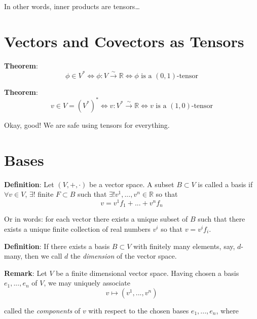 \documentclass[
  letterpaper,
  DIV=11,
  numbers=noendperiod,
  oneside]{scrreprt}
\begin{document}
In other words, inner products are tensors\ldots{}

\hypertarget{vectors-and-covectors-as-tensors}{%
\section{Vectors and Covectors as
Tensors}\label{vectors-and-covectors-as-tensors}}

\textbf{Theorem}: \begin{equation}
    \phi \in V^* \iff \phi: V\xrightarrow{\sim}\mathbb{R} \iff \phi \text{ is a } (0,1)\text{-tensor}
\end{equation}

\textbf{Theorem}: \begin{equation}
    v\in V=(V^*)^* \iff v:V^* \xrightarrow{\sim} \mathbb{R} \iff v \text{ is a } (1,0)\text{-tensor}
\end{equation}

Okay, good! We are safe using tensors for everything.

\hypertarget{bases}{%
\section{Bases}\label{bases}}

\textbf{Definition}: Let \((V, +, \cdot)\) be a vector space. A subset
\(B \subset V\) is called a basis if
\(\forall v\in V\), \(\exists !\) finite \(F\subset B\) such that
\(\exists ! v^1,...,v^n \in \mathbb{R}\) so that \begin{equation}
 v = v^1f_1 + ... + v^n f_n
\end{equation}

Or in words: for each vector there exists a unique subset of \(B\) such
that there exists a unique finite collection of real numbers \(v^i\) so
that \(v=v^if_i\).

\textbf{Definition}: If there exists a basis \(B\subset V\) with
finitely many elements, say, \(d\)-many, then we call \(d\) the
\emph{dimension} of the vector space.

\textbf{Remark}: Let \(V\) be a finite dimensional vector space. Having
chosen a basis \(e_1, ..., e_n\) of \(V\), we may uniquely associate
\begin{equation}
    v \mapsto (v^1, ..., v^n)
\end{equation}

called the \emph{components} of \(v\) with respect to the chosen bases
\(e_1,...,e_n\), where
\end{document}
